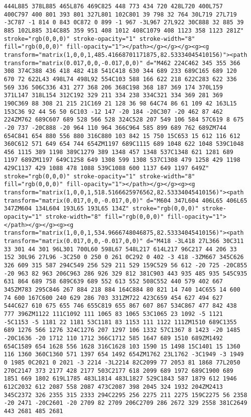 \documentclass[
]{article}
\begin{document}
\begin{verbatim}
444L885 378L885 465L876 469C825 448 773 434 720 428L720 400L757 400C797 400 801 393 801 327L801 102C801 39 798 32 764 30L719 27L719 -3C787 -1 814 0 843 0C872 0 899 -1 967 -3L967 27L922 30C888 32 885 39 885 102L885 314C885 359 951 408 1012 408C1079 408 1123 358 1123 281Z" stroke="rgb(0,0,0)" stroke-opacity="1" stroke-width="8" fill="rgb(0,0,0)" fill-opacity="1"></path></g></g></g><g><g transform="matrix(1,0,0,1,485.41668701171875,82.53334045410156)"><path transform="matrix(0.017,0,0,-0.017,0,0)" d="M462 224C462 345 355 366 308 374C388 436 418 482 418 541C418 630 344 689 233 689C165 689 120 670 72 622L43 498L74 498L92 554C103 588 166 622 218 622C283 622 336 569 336 506C336 431 277 368 206 368C198 368 187 369 174 370L159 371L147 318L154 312C192 329 211 334 238 334C321 334 369 281 369 190C369 88 308 21 215 21C169 21 128 36 98 64C74 86 61 109 42 163L15 153C36 92 44 56 50 6C103 -12 147 -20 184 -20C307 -20 462 87 462 224ZM762 689C607 689 528 566 528 324C528 207 549 106 584 57C619 8 675 -20 737 -20C888 -20 964 110 964 366C964 585 899 689 762 689ZM744 654C841 654 880 556 880 316C880 103 842 15 750 15C653 15 612 116 612 360C612 571 649 654 744 654ZM1197 689C1115 689 1048 622 1048 539C1048 456 1115 389 1198 389C1279 389 1348 457 1348 537C1348 621 1281 689 1197 689ZM1197 649C1258 649 1308 599 1308 537C1308 479 1258 429 1198 429C1137 429 1088 478 1088 539C1088 600 1137 649 1197 649Z" stroke="rgb(0,0,0)" stroke-opacity="1" stroke-width="8" fill="rgb(0,0,0)" fill-opacity="1"></path></g></g><g><g transform="matrix(1,0,0,1,518.5166625976562,82.53334045410156)"><path transform="matrix(0.017,0,0,-0.017,0,0)" d="M604 347L604 406L65 406L65 347ZM604 134L604 193L65 193L65 134Z" stroke="rgb(0,0,0)" stroke-opacity="1" stroke-width="8" fill="rgb(0,0,0)" fill-opacity="1"></path></g></g><g><g transform="matrix(1,0,0,1,534.9666748046875,82.53334045410156)"><path transform="matrix(0.017,0,0,-0.017,0,0)" d="M418 -3L418 27L366 30C311 33 301 44 301 96L301 700L60 598L67 548L217 614L217 96C217 44 206 33 152 30L96 27L96 -3C250 0 250 0 261 0C292 0 402 -3 418 -3ZM667 345C626 326 609 315 587 294C549 256 529 211 529 159C529 56 612 -20 725 -20C855 -20 963 82 963 206C963 286 926 329 812 381C903 443 935 485 935 545C935 631 864 689 758 689C639 689 552 613 552 508C552 440 579 402 667 345ZM783 295C846 267 884 218 884 164C884 80 821 14 740 14C655 14 600 74 600 167C600 240 629 286 703 331ZM722 423C659 454 627 494 627 544C627 610 675 655 746 655C819 655 867 607 867 534C867 477 842 438 777 396ZM1122 111C1092 111 1065 83 1065 53C1065 23 1092 -5 1121 -5C1153 -5 1181 22 1181 53C1181 83 1153 111 1122 111ZM1510 689C1355 689 1276 566 1276 324C1276 207 1297 106 1332 57C1367 8 1423 -20 1485 -20C1636 -20 1712 110 1712 366C1712 585 1647 689 1510 689ZM1492 654C1589 654 1628 556 1628 316C1628 103 1590 15 1498 15C1401 15 1360 116 1360 360C1360 571 1397 654 1492 654ZM1762 23L1762 -3C1949 -3 1949 0 1985 0C2021 0 2021 -3 2214 -3L2214 82C2099 77 2053 81 1868 77L2050 270C2147 373 2177 428 2177 503C2177 618 2099 689 1972 689C1900 689 1851 669 1802 619L1785 483L1814 483L1827 529C1843 587 1879 612 1946 612C2032 612 2087 558 2087 473C2087 398 2045 324 1932 204ZM2413 345C2372 326 2355 315 2333 294C2295 256 2275 211 2275 159C2275 56 2358 -20 2471 -20C2601 -20 2709 82 2709 206C2709 286 2672 329 2558 381C2649 443 2681 485 2681 
\end{verbatim}
\end{document}
